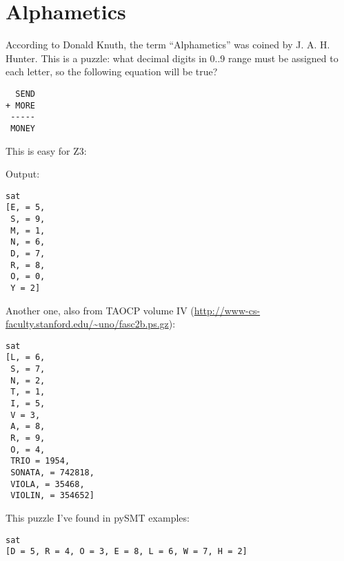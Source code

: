 \section{Alphametics}

According to Donald Knuth, the term ``Alphametics'' was coined by J. A. H. Hunter.
This is a puzzle: what decimal digits in 0..9 range must be assigned to each letter,
so the following equation will be true?

\begin{lstlisting}
  SEND
+ MORE
 -----
 MONEY
\end{lstlisting}

This is easy for Z3:



Output:

\begin{lstlisting}
sat
[E, = 5,
 S, = 9,
 M, = 1,
 N, = 6,
 D, = 7,
 R, = 8,
 O, = 0,
 Y = 2]
\end{lstlisting}

Another one, also from \ac{TAOCP} volume IV (\url{http://www-cs-faculty.stanford.edu/~uno/fasc2b.ps.gz}):



\begin{lstlisting}
sat
[L, = 6,
 S, = 7,
 N, = 2,
 T, = 1,
 I, = 5,
 V = 3,
 A, = 8,
 R, = 9,
 O, = 4,
 TRIO = 1954,
 SONATA, = 742818,
 VIOLA, = 35468,
 VIOLIN, = 354652]
\end{lstlisting}

This puzzle I've found in pySMT examples:



\begin{lstlisting}
sat
[D = 5, R = 4, O = 3, E = 8, L = 6, W = 7, H = 2]
\end{lstlisting}

